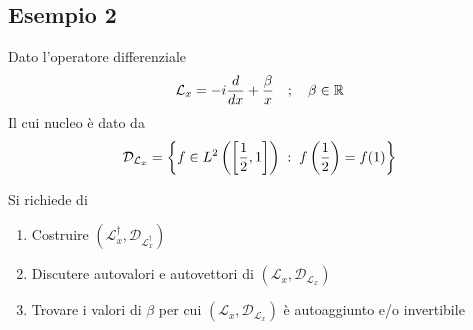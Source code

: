 \newpage

\subsection{Esempio 2}

Dato l'operatore differenziale
\begin{align}
	\mathcal{L}_x = -i \frac{d}{dx} + \frac{\beta}{x} \quad ; \quad \beta \in \mathbb{R}
\end{align}
Il cui nucleo è dato da
\begin{align}
	\mathcal{D}_{\mathcal{L}_x} = \left\{ f \in L^2 \left( \left[\frac{1}{2},1\right] \right) \; : \; f\left(\frac{1}{2}\right) = f(1) \right\}
\end{align}

Si richiede di
\begin{enumerate}
	\item Costruire $(\mathcal{L}_x^\dagger, \mathcal{D}_{\mathcal{L}_x^\dagger})$
	\item Discutere autovalori e autovettori di $(\mathcal{L}_x, \mathcal{D}_{\mathcal{L}_x})$
	\item Trovare i valori di $\beta$ per cui $(\mathcal{L}_x, \mathcal{D}_{\mathcal{L}_x})$ è autoaggiunto e/o invertibile
\end{enumerate}

